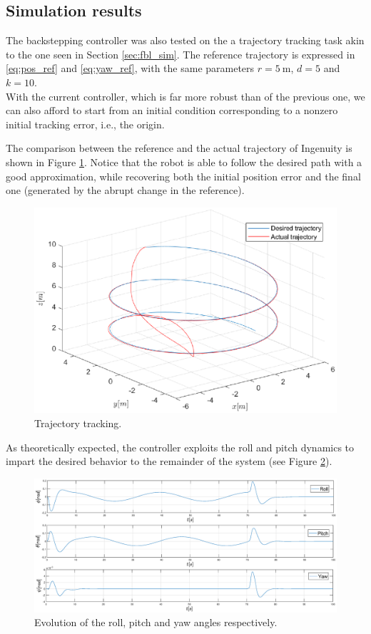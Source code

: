 \subsection{Simulation results} 
The backstepping controller was also tested on the a trajectory tracking task akin to the one seen in Section \ref{sec:fbl_sim}. The reference trajectory is expressed in \ref{eq:pos_ref} and \ref{eq:yaw_ref}, with the same parameters $r = \qty{5}{\meter}$, $d = 5$ and $k = 10$. 
\\With the current controller, which is far more robust than of the previous one, we can also afford to start from an initial condition corresponding to a nonzero initial tracking error, i.e., the origin.

The comparison between the reference and the actual trajectory of Ingenuity is shown in Figure \ref{fig:BS_trajectory}. Notice that the robot is able to follow the desired path with a good approximation, while recovering both the initial position error and the final one (generated by the abrupt change in the reference). 
\begin{figure}[H]
    \centering
    \includegraphics[scale=0.5]{figures/BS_trajectory}
    \caption{Trajectory tracking.}
    \label{fig:BS_trajectory}
\end{figure}
As theoretically expected, the controller exploits the roll and pitch dynamics to impart the desired behavior to the remainder of the system (see Figure \ref{fig:BS_attitude}). 
\begin{figure}[H]
    \centering
    \includegraphics[scale=0.2]{figures/BS_attitude}
    \caption{Evolution of the roll, pitch and yaw angles respectively.}
    \label{fig:BS_attitude}
\end{figure}
